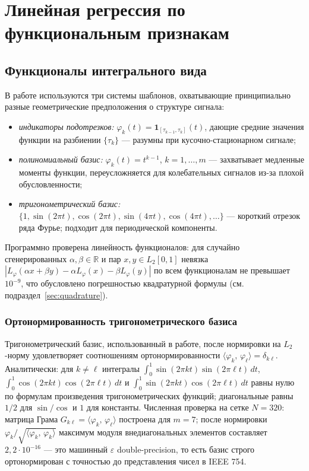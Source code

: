 \documentclass[12pt,a4paper]{article}
\theoremstyle{definition}
\theoremstyle{remark}
\newcommand{\R}{\mathbb{R}}
\newcommand{\Ltwo}{L_{2}[0,1]}
\newcommand{\inner}[2]{\langle #1,\,#2\rangle}
\begin{document}
\section{Линейная регрессия по функциональным признакам}
\label{sec:linear}

\subsection{Функционалы интегрального вида}

В работе используются три системы шаблонов, охватывающие принципиально разные
геометрические предположения о структуре сигнала:
\begin{itemize}[leftmargin=*,itemsep=2pt,topsep=2pt]
    \item \emph{индикаторы подотрезков:}
    $\varphi_{k}(t)=\mathbf{1}_{[\tau_{k-1},\tau_{k}]}(t)$,
    дающие средние значения функции на разбиении $\{\tau_{k}\}$ --- разумны при
    кусочно-стационарном сигнале;
    \item \emph{полиномиальный базис:}
    $\varphi_{k}(t)=t^{k-1}$,
    $k=1,\dots,m$ --- захватывает медленные моменты функции, переусложняется
    для колебательных сигналов из-за плохой обусловленности;
    \item \emph{тригонометрический базис:}
    $\{1,\sin(2\pi t),\cos(2\pi t),\sin(4\pi t),\cos(4\pi t),\dots\}$ ---
    короткий отрезок ряда Фурье; подходит для периодической компоненты.
\end{itemize}

\noindent Программно проверена линейность функционалов: для случайно
сгенерированных $\alpha,\beta\in\R$ и пар $x,y\in\Ltwo$ невязка
$|L_{\varphi}(\alpha x+\beta y)-\alpha L_{\varphi}(x)-\beta L_{\varphi}(y)|$
по всем функционалам не превышает $10^{-9}$, что обусловлено погрешностью
квадратурной формулы (см. подраздел~\ref{sec:quadrature}).

\subsubsection{Ортонормированность тригонометрического базиса}
\label{sec:orthonormality}

Тригонометрический базис, использованный в работе, после нормировки на
$L_2$-норму удовлетворяет соотношениям ортонормированности
$\inner{\varphi_k}{\varphi_\ell}=\delta_{k\ell}$. Аналитически: для
$k\neq \ell$ интегралы $\int_{0}^{1}\sin(2\pi k t)\sin(2\pi\ell t)\,dt$,
$\int_{0}^{1}\cos(2\pi k t)\cos(2\pi\ell t)\,dt$ и
$\int_{0}^{1}\sin(2\pi k t)\cos(2\pi\ell t)\,dt$ равны нулю по формулам
произведения тригонометрических функций; диагональные равны $1/2$ для
$\sin/\cos$ и $1$ для константы. Численная проверка на сетке $N=320$:
матрица Грама $G_{k\ell}=\inner{\varphi_k}{\varphi_\ell}$ построена для
$m=7$; после нормировки $\varphi_k/\sqrt{\inner{\varphi_k}{\varphi_k}}$
максимум модуля внедиагональных элементов составляет $2{,}2\cdot 10^{-16}$
--- это машинный $\varepsilon$ double-precision, то есть базис строго
ортонормирован с точностью до представления чисел в IEEE 754.
\end{document}
